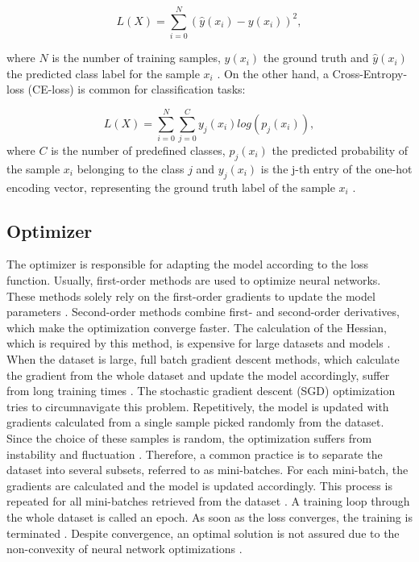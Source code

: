 \begin{equation}
L(X) = \sum_{i=0}^{N}(\hat{y}(x_{i})-y(x_{i}))^2,
\end{equation}

where $N$ is the number of training samples, $y(x_{i})$ the ground truth and $\hat{y}(x_{i})$ the predicted class label for the sample $x_{i}$ \cite{Calin2020}. On the other hand, a Cross-Entropy-loss (CE-loss) is common for classification tasks: 

\begin{equation}
L(X) = \sum_{i=0}^{N} \sum_{j=0}^{C} y_{j}(x_{i}) log(p_{j}(x_{i})),
\end{equation}
where $C$ is the number of predefined classes, $p_{j}(x_{i})$ the predicted probability of the sample $x_{i}$ belonging to the class $j$ and $y_{j}(x_{i})$ is the j-th entry of the one-hot encoding vector, representing the ground truth label of the sample $x_{i}$ \cite{ShilohPerl2020}.



\subsection{Optimizer}
The optimizer is responsible for adapting the model according to the loss function. Usually, first-order methods are used to optimize neural networks. These methods solely rely on the first-order gradients to update the model parameters \cite{ShilohPerl2020}. Second-order methods combine first- and second-order derivatives, which make the optimization converge faster. The calculation of the Hessian, which is required by this method, is expensive for large datasets and models \cite{Calin2020}\cite{ShilohPerl2020}. When the dataset is large, full batch gradient descent methods, which calculate the gradient from the whole dataset and update the model accordingly, suffer from long training times \cite{ShilohPerl2020}. The stochastic gradient descent (SGD) optimization tries to circumnavigate this problem. Repetitively, the model is updated with gradients calculated from a single sample picked randomly from the dataset. Since the choice of these samples is random, the optimization suffers from instability and fluctuation \cite{ShilohPerl2020}. Therefore, a common practice is to separate the dataset into several subsets, referred to as mini-batches. For each mini-batch, the gradients are calculated and the model is updated accordingly. This process is repeated for all mini-batches retrieved from the dataset \cite{ShilohPerl2020}. A training loop through the whole dataset is called an epoch. As soon as the loss converges, the training is terminated \cite{ShilohPerl2020}. Despite convergence, an optimal solution is not assured due to the non-convexity of neural network optimizations \cite{ShilohPerl2020}.

